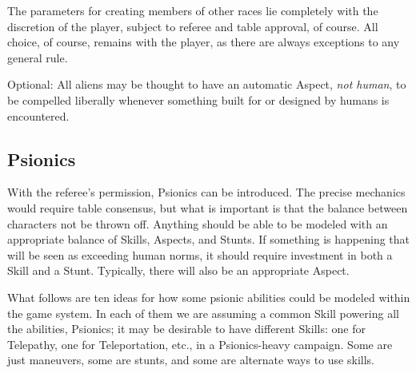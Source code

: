 The parameters for creating members of other races lie completely with the discretion of the player, subject to referee and table approval, of course. All choice, of course, remains with the player, as there are always exceptions to any general rule.

Optional: All aliens may be thought to have an automatic Aspect, \emph{not human}, to be compelled liberally whenever something built for or designed by humans is encountered.



\subsection{Psionics}\label{sec:Psionics} %

With the referee's permission, Psionics can be introduced. The precise mechanics would require table consensus, but what is important is that the balance between characters not be thrown off. Anything should be able to be modeled with an appropriate balance of Skills, Aspects, and Stunts.  If something is happening that will be seen as exceeding human norms, it should require investment in both a Skill and a Stunt. Typically, there will also be an appropriate Aspect.

What follows are ten ideas for how some psionic abilities could be modeled within the game system. In each of them we are assuming a common Skill powering all the abilities, Psionics; it may be desirable to have different Skills: one for Telepathy, one for Teleportation, etc., in a Psionics-heavy campaign. Some are just maneuvers, some are stunts, and some are alternate ways to use skills.

